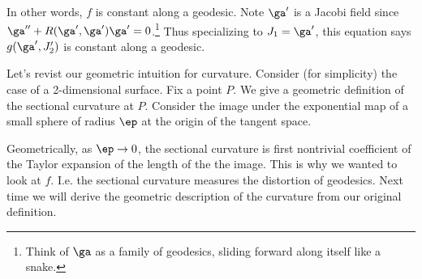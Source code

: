 In other words, $f$ is constant along a geodesic. Note $\ga'$ is a Jacobi field %
since $\ga''+R(\ga',\ga')\ga'=0$.\footnote{Think of $\ga$ as a family of geodesics, sliding forward along itself like a snake.} Thus specializing to $J_1=\ga'$, this equation says $g(\ga',J_2')$ is constant along a geodesic.

%
Let's revist our geometric intuition for curvature. Consider (for simplicity) the case of a 2-dimensional surface. %
Fix a point $P$. We give a geometric definition of the sectional curvature at $P$. Consider the image under the exponential map of a small sphere of radius $\ep$ at the origin of the tangent space.


Geometrically, as $\ep\to 0$, the sectional curvature is first nontrivial coefficient of the Taylor expansion of the length of the the image. This is why we wanted to look at $f$. %
I.e. the sectional curvature measures the distortion of geodesics. Next time we will derive the geometric description of the curvature from our original definition.
